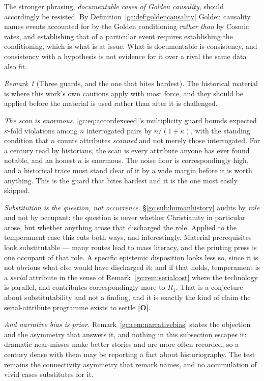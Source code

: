 \documentclass[11pt]{article}
\numberwithin{equation}{section}
\theoremstyle{plain}
\theoremstyle{definition}
\theoremstyle{remark}
\newtheorem{remark}[theorem]{Remark}
\begin{document}
The stronger phrasing, \emph{documentable cases of Golden causality}, should accordingly be resisted. By
Definition~\ref{gc:def:goldencausality} Golden causality names events
accounted for by the Golden conditioning \emph{rather than} by Cosmic
rates, and establishing that of a particular event requires establishing
the conditioning, which is what is at issue. What is documentable is
consistency, and consistency with a hypothesis is not evidence for it
over a rival the same data also fit.

\begin{remark}[Three guards, and the one that bites hardest]
\label{gc:rem:historyguards}
The historical material is where this work's own cautions apply with
most force, and they should be applied before the material is used
rather than after it is challenged.

\emph{The scan is enormous.} \eqref{gc:eq:accordexceed}'s multiplicity
guard bounds expected $\kappa$-fold violations among $n$ interrogated
pairs by $n/(1+\kappa)$, with the standing condition that $n$ counts
attributes \emph{scanned} and not merely those interrogated. For a
century read by historians, the scan is every attribute anyone has ever
found notable, and an honest $n$ is enormous. The noise floor is
correspondingly high, and a historical trace must stand clear of it by a
wide margin before it is worth anything. This is the guard that bites
hardest and it is the one most easily skipped.

\emph{Substitution is the question, not occurrence.}
\S\ref{gc:sub:humanhistory} audits by \emph{role} and not by occupant:
the question is never whether Christianity in particular arose, but
whether anything arose that discharged the role. Applied to the
temperament case this cuts both ways, and interestingly. Material
prerequisites look substitutable --- many routes lead to mass literacy,
and the printing press is one occupant of that role. A specific epistemic
disposition looks less so, since it is not obvious what else would have
discharged it; and if that holds, temperament is a \emph{serial}
attribute in the sense of Remark~\ref{gc:rem:serialcost} where the technology
is parallel, and contributes correspondingly more to $R_1$. That is a
conjecture about substitutability and not a finding, and it is exactly
the kind of claim the serial-attribute programme exists to settle
\textbf{[O]}.

\emph{And narrative bias is prior.} Remark~\ref{gc:rem:narrativebias}
states the objection and the asymmetry that answers it, and nothing in
this subsection escapes it: dramatic near-misses make better stories and
are more often recorded, so a century dense with them may be reporting a
fact about historiography. The test remains the connectivity asymmetry
that remark names, and no accumulation of vivid cases substitutes for it.
\end{remark}
\end{document}
